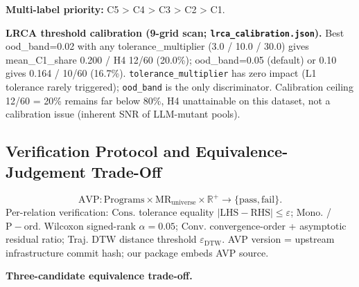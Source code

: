 \documentclass[manuscript,screen,review]{acmart}
\begin{document}
\textbf{Multi-label priority:} C5 \textgreater{} C4 \textgreater{} C3
\textgreater{} C2 \textgreater{} C1.

\textbf{LRCA threshold calibration (9-grid scan;
\texttt{lrca\_calibration.json}).} Best ood\_band=0.02 with any
tolerance\_multiplier (3.0 / 10.0 / 30.0) gives mean\_C1\_share 0.200 /
H4 12/60 (20.0\%); ood\_band=0.05 (default) or 0.10 gives 0.164 / 10/60
(16.7\%). \texttt{tolerance\_multiplier} has zero impact (L1 tolerance
rarely triggered); \texttt{ood\_band} is the only discriminator.
Calibration ceiling 12/60 = 20\% remains far below 80\%, H4
unattainable on this dataset, not a calibration issue (inherent SNR of
LLM-mutant pools).

\subsection{Verification Protocol and Equivalence-Judgement Trade-Off}\label{a.3-avp-protocol-specification-and-equivalence-judgement-trade-off}

\[
\mathrm{AVP}: \mathrm{Programs} \times \mathrm{MR}_{\mathrm{universe}} \times \mathbb{R}^{+} \to \{\mathrm{pass}, \mathrm{fail}\}.
\]
Per-relation verification: $\mathrm{Cons.}$ tolerance equality $|\mathrm{LHS} -
\mathrm{RHS}| \leq \varepsilon$; $\mathrm{Mono.}$ / $\mathrm{P-ord.}$ Wilcoxon signed-rank $\alpha=0.05$; $\mathrm{Conv.}$
convergence-order + asymptotic residual ratio; Traj. DTW distance
threshold $\varepsilon_{\mathrm{DTW}}$. AVP version = upstream infrastructure commit hash; our package embeds
AVP source.

\textbf{Three-candidate equivalence trade-off.}
\end{document}
